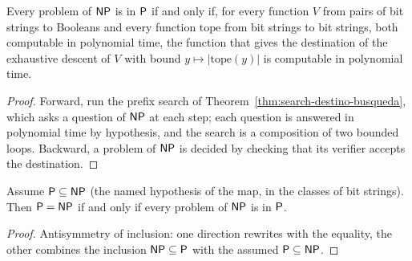 \begin{theorem}
  \label{thm:search-otra-direccion}
  \leanok
  Every problem of $\cNP$ is in $\cP$ if and only if, for every function $V$ from pairs of bit
  strings to Booleans and every function $\mathrm{tope}$ from bit strings to bit strings, both
  computable in polynomial time, the function that gives the destination of the exhaustive descent
  of $V$ with bound $y \mapsto |\mathrm{tope}(y)|$ is computable in polynomial time.
\end{theorem}

\begin{proof}
  \leanok
  Forward, run the prefix search of Theorem~\ref{thm:search-destino-busqueda}, which asks a
  question of $\cNP$ at each step; each question is answered in polynomial time by hypothesis, and
  the search is a composition of two bounded loops. Backward, a problem of $\cNP$ is decided by
  checking that its verifier accepts the destination.
\end{proof}

\begin{theorem}[$\cP = \cNP$ if and only if every problem of $\cNP$ is in $\cP$, assuming $\cP \subseteq \cNP$]
  \label{thm:search-pnp-verificar}
  \leanok
  Assume $\cP \subseteq \cNP$ (the named hypothesis of the map, in the classes of bit strings).
  Then $\cP = \cNP$ if and only if every problem of $\cNP$ is in $\cP$.
\end{theorem}

\begin{proof}
  \leanok
  Antisymmetry of inclusion: one direction rewrites with the equality, the other combines the
  inclusion $\mathsf{NP} \subseteq \mathsf{P}$ with the assumed $\cP \subseteq \cNP$.
\end{proof}


